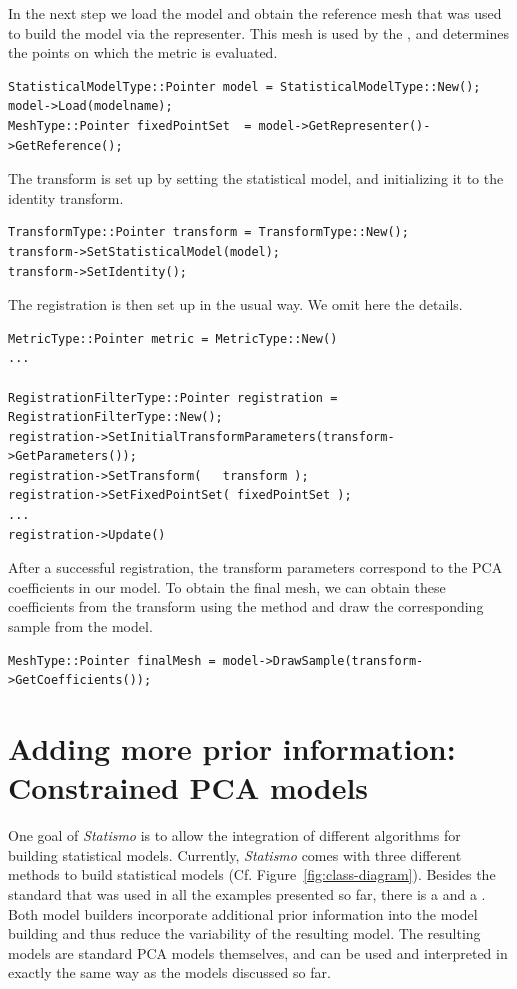 \documentclass{InsightArticle}
\newcommand{\Statismo}{\emph{Statismo}\xspace}
\begin{document}
In the next step we load the model and obtain the reference mesh that was used to build the model via
the representer. This mesh is used by the , and determines the points on which the 
metric is evaluated. 
\begin{verbatim}
StatisticalModelType::Pointer model = StatisticalModelType::New();
model->Load(modelname);
MeshType::Pointer fixedPointSet  = model->GetRepresenter()->GetReference();
\end{verbatim}

The transform is set up by setting the statistical model, and initializing it to the identity transform. 
\begin{verbatim}
TransformType::Pointer transform = TransformType::New();
transform->SetStatisticalModel(model);
transform->SetIdentity();
\end{verbatim}

The registration is then set up in the usual way. We omit here the details.
\begin{verbatim}
MetricType::Pointer metric = MetricType::New()
...

RegistrationFilterType::Pointer registration = RegistrationFilterType::New();
registration->SetInitialTransformParameters(transform->GetParameters());
registration->SetTransform(   transform );
registration->SetFixedPointSet( fixedPointSet );
...
registration->Update()
\end{verbatim}

After a successful registration, the transform parameters correspond to the PCA coefficients in our model. 
To obtain the final mesh, we can obtain these coefficients from the transform using the method  
and draw the corresponding sample from the model. 
\begin{verbatim}
MeshType::Pointer finalMesh = model->DrawSample(transform->GetCoefficients());
\end{verbatim}


\section{Adding more prior information: Constrained PCA models }
One goal of \Statismo is to allow the integration of  different algorithms for building statistical models.
Currently, \Statismo comes with three different methods to build statistical models (Cf. Figure~\ref{fig:class-diagram}). Besides the standard  that was used in all the examples presented so far, there is a  \cite{luthi_probabilistic_2009} and a  \cite{blanc_conditional_2009}. Both model builders incorporate additional prior information into the model building and thus reduce the variability of the resulting model. The resulting models are standard PCA models themselves, and can be used and interpreted in exactly the same way as the models discussed so far. 
\end{document}
